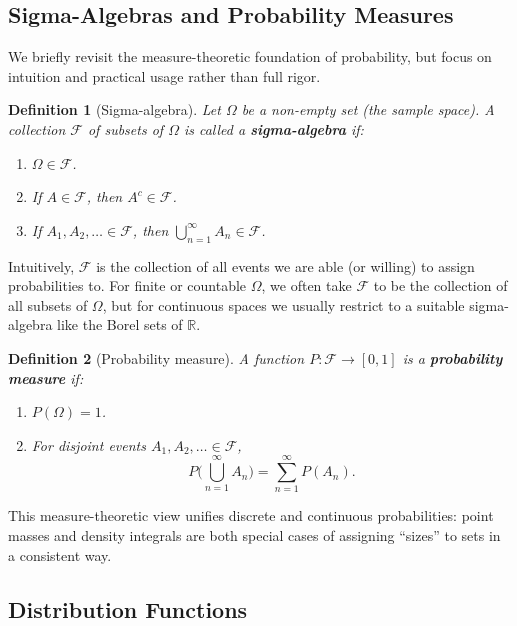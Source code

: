 \documentclass[11pt,a4paper]{article}
\newtheorem{definition}{Definition}[section]
\begin{document}
\subsection{Sigma-Algebras and Probability Measures}

We briefly revisit the measure-theoretic foundation of probability, but focus on intuition and practical usage rather than full rigor.

\begin{definition}[Sigma-algebra]
Let $\Omega$ be a non-empty set (the sample space). 
A collection $\mathcal{F}$ of subsets of $\Omega$ is called a \textbf{sigma-algebra} if:
\begin{enumerate}
    \item $\Omega \in \mathcal{F}$.
    \item If $A \in \mathcal{F}$, then $A^c \in \mathcal{F}$.
    \item If $A_1, A_2, \dots \in \mathcal{F}$, then $\displaystyle \bigcup_{n=1}^\infty A_n \in \mathcal{F}$.
\end{enumerate}
\end{definition}

Intuitively, $\mathcal{F}$ is the collection of all events we are able (or willing) to assign probabilities to. 
For finite or countable $\Omega$, we often take $\mathcal{F}$ to be the collection of all subsets of $\Omega$, but for continuous spaces we usually restrict to a suitable sigma-algebra like the Borel sets of $\mathbb{R}$.

\begin{definition}[Probability measure]
A function $P : \mathcal{F} \to [0,1]$ is a \textbf{probability measure} if:
\begin{enumerate}
    \item $P(\Omega) = 1$.
    \item For disjoint events $A_1, A_2, \dots \in \mathcal{F}$,
    \[
    P\Big(\bigcup_{n=1}^\infty A_n\Big) = \sum_{n=1}^\infty P(A_n).
    \]
\end{enumerate}
\end{definition}

This measure-theoretic view unifies discrete and continuous probabilities: point masses and density integrals are both special cases of assigning ``sizes'' to sets in a consistent way.

\subsection{Distribution Functions}
\end{document}
